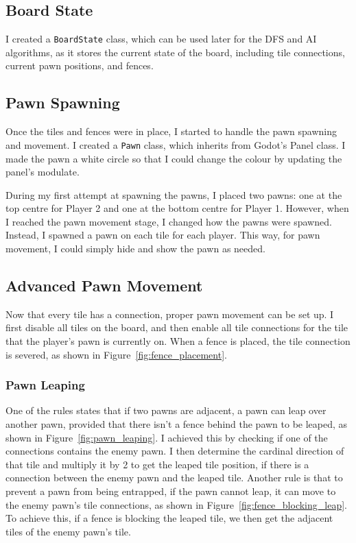 \documentclass[progress]{cmpreport}
\begin{document}
\subsection{Board State}
I created a \texttt{BoardState} class, which can be used later for the DFS and AI algorithms, as it stores the current state of the board, including tile connections, current pawn positions, and fences.

\subsection{Pawn Spawning}
Once the tiles and fences were in place, I started to handle the pawn spawning and movement. I created a \texttt{Pawn} class, which inherits from Godot's Panel class. I made the pawn a white circle so that I could change the colour by updating the panel's modulate.  

\noindent During my first attempt at spawning the pawns, I placed two pawns: one at the top centre for Player 2 and one at the bottom centre for Player 1. However, when I reached the pawn movement stage, I changed how the pawns were spawned. Instead, I spawned a pawn on each tile for each player. This way, for pawn movement, I could simply hide and show the pawn as needed.

\subsection{Advanced Pawn Movement}
Now that every tile has a connection, proper pawn movement can be set up. I first disable all tiles on the board, and then enable all tile connections for the tile that the player's pawn is currently on. When a fence is placed, the tile connection is severed, as shown in Figure~\ref{fig:fence_placement}.

\subsubsection{Pawn Leaping}
One of the rules states that if two pawns are adjacent, a pawn can leap over another pawn, provided that there isn't a fence behind the pawn to be leaped, as shown in Figure~\ref{fig:pawn_leaping}. I achieved this by checking if one of the connections contains the enemy pawn. I then determine the cardinal direction of that tile and multiply it by 2 to get the leaped tile position, if there is a connection between the enemy pawn and the leaped tile. Another rule is that to prevent a pawn from being entrapped, if the pawn cannot leap, it can move to the enemy pawn's tile connections, as shown in Figure~\ref{fig:fence_blocking_leap}. To achieve this, if a fence is blocking the leaped tile, we then get the adjacent tiles of the enemy pawn's tile.
\end{document}
